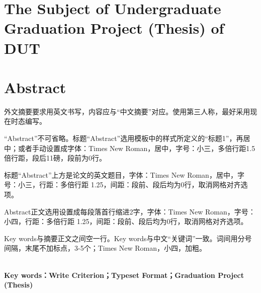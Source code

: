 \documentclass[UTF8,a4paper]{ctexart}
\numberwithin{table}{section}
\numberwithin{equation}{section}
\begin{document}
	\newpage
	\section*{{\fontsize{15}{22.5} {The Subject of Undergraduate Graduation Project (Thesis) of DUT}}}
	\section*{\fontsize{15}{22.5} Abstract}
	外文摘要要求用英文书写，内容应与“中文摘要”对应。使用第三人称，最好采用现在时态编写。\par 
	“Abstract”不可省略。标题“Abstract”选用模板中的样式所定义的“标题1”，再居中；或者手动设置成字体：Times New Roman，居中，字号：小三，多倍行距1.5倍行距，段后11磅，段前为0行。\par 
	标题“Abstract”上方是论文的英文题目，字体：Times New Roman，居中，字号：小三，行距：多倍行距 1.25，间距：段前、段后均为0行，取消网格对齐选项。\par 
	Abstract正文选用设置成每段落首行缩进2字，字体：Times New Roman，字号：小四，行距：多倍行距 1.25，间距：段前、段后均为0行，取消网格对齐选项。\par 
	Key words与摘要正文之间空一行。Key words与中文“关键词”一致。词间用分号间隔，末尾不加标点，3-5个；Times New Roman，小四，加粗。\par 
	\quad \\
	{\bf{Key words：Write Criterion；Typeset Format；Graduation Project (Thesis)} }
	
	\newpage
	\tableofcontents
	\newpage
	\setcounter{page}{1}
\end{document}
